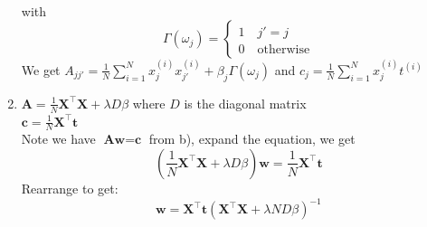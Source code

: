 \documentclass[12pt]{article}
\begin{document}
\begin{enumerate}[label=\alph*)]
\begin{align*}
		\end{align*} with \begin{equation*}
		\Gamma(\omega_j)=\begin{cases}
			1 \quad j'=j \\ 0 \quad\text{otherwise}
		\end{cases}
	\end{equation*}
		We get $A_{jj'}=\frac{1}{N}\sum_{i=1}^Nx_j^{(i)}x_{j'}^{(i)}+\beta_j\Gamma(\omega_j)$ and $c_j=\frac{1}{N}\sum_{i=1}^Nx_j^{(i)}t^{(i)}$
		\item $\textbf{A}=\frac{1}{N}\textbf{X}^\top\textbf{X}+\lambda D\beta$ where $D$ is the diagonal matrix\\
		$\textbf{c}=\frac{1}{N}\textbf{X}^\top\textbf{t}$\\
		Note we have $\textbf{A}\textbf{w}=\textbf{c}$ from b), expand the equation, we get
		\[(\frac{1}{N}\textbf{X}^\top\textbf{X}+\lambda D\beta)\textbf{w}=\frac{1}{N}\textbf{X}^\top\textbf{t}\]
		Rearrange to get:
		\[\textbf{w}=\textbf{X}^\top\textbf{t}(\textbf{X}^\top\textbf{X}+\lambda ND\beta)^{-1}\]
	\end{enumerate}
	
	
	
	
	
	
	
	
	
	
	
\end{document}

